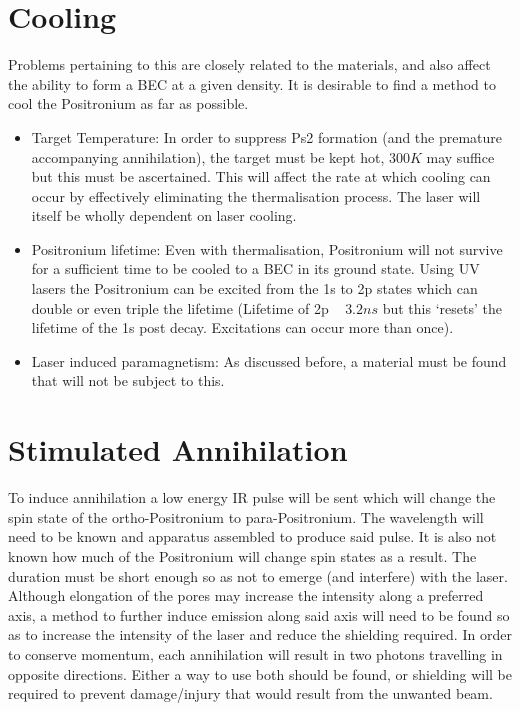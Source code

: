 \section{Cooling}
Problems pertaining to this are closely related to the materials, and also affect the ability to form a BEC at a given density. It is desirable to find a method to cool the Positronium as far as possible.
\begin{itemize}
	\item Target Temperature: In order to suppress Ps2 formation (and the premature accompanying annihilation), the target must be kept hot, $300K$ may suffice but this must be ascertained. This will affect the rate at which cooling can occur by effectively eliminating the thermalisation process. The laser will itself be wholly dependent on laser cooling.
	\item Positronium lifetime: Even with thermalisation, Positronium will not survive for a sufficient time to be cooled to a BEC in its ground state. Using UV lasers the Positronium can be excited from the 1s to 2p states which can double or even triple the lifetime (Lifetime of 2p ~ $3.2ns$ but this ‘resets’ the lifetime of the 1s post decay. Excitations can occur more than once).
	\item Laser induced paramagnetism: As discussed before, a material must be found that will not be subject to this.
\end{itemize}

\section{Stimulated Annihilation}
To induce annihilation a low energy IR pulse will be sent which will change the spin state of the ortho-Positronium to para-Positronium. The wavelength will need to be known and apparatus assembled to produce said pulse. It is also not known how much of the Positronium will change spin states as a result. The duration must be short enough so as not to emerge (and interfere) with the laser.
Although elongation of the pores may increase the intensity along a preferred axis, a method to further induce emission along said axis will need to be found so as to increase the intensity of the laser and reduce the shielding required.
\newline
\newline
In order to conserve momentum, each annihilation will result in two photons travelling in opposite directions. Either a way to use both should be found, or shielding will be required to prevent damage/injury that would result from the unwanted beam.
